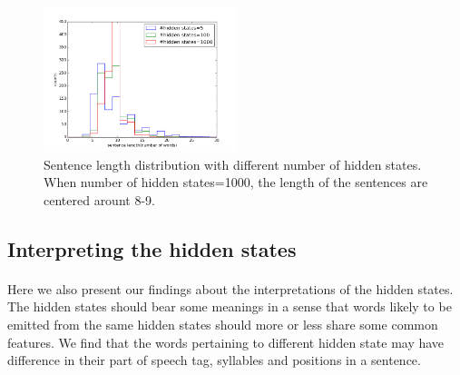 \begin{figure}[h!]
 \centering
 \includegraphics[width=0.5\textwidth]{./figure/hiddenstate_len_distri.png}
 \caption{Sentence length distribution with different number of hidden states. When number of hidden states=1000, the length of the sentences are centered arount 8-9.}
 \end{figure}
\vspace{5pt}
\subsection{Interpreting the hidden states}
\vspace{5pt}

\paragraph{} Here we also present our findings about the interpretations of the hidden states.
The hidden states should bear some meanings in a sense that words likely to be emitted from the same hidden states should more or less share some common features. We find that the words pertaining to different hidden state may have difference in their part of speech tag, syllables and positions in a sentence.

